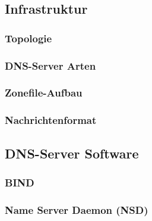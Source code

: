 \documentclass[a4paper, 11pt, toc=bibliography, toc=listof]{scrbook}
\begin{document}

			\subsection{Infrastruktur} %
			\label{sub:Infrastruktur}

				\subsubsection{Topologie} %
				\label{sub:Topologie}
				
				
				\subsubsection{DNS-Server Arten} %
				\label{sub:DNS-Server Arten}
				

				\subsubsection{Zonefile-Aufbau} %
				\label{sub:Zonefile-Aufbau}
				

				\subsubsection{Nachrichtenformat} %
				\label{sub:Nachrichtenformat}
				


			\subsection{DNS-Server Software} %
			\label{sub:DNS-Server Software}
			
				\subsubsection{BIND} %
				\label{sub:BIND}
				

				\subsubsection{Name Server Daemon (NSD)} %
				\label{ssub:Name Server Daemon (NSD)}
				
\end{document}
